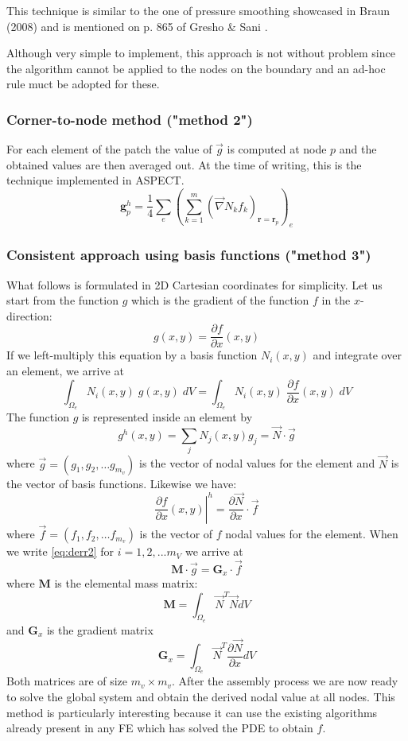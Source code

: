This technique is similar to the one of pressure smoothing showcased 
in Braun \etal (2008) \cite{brtf08}
and is mentioned on p. 865 of Gresho \& Sani \cite{grsa}.

Although very simple to implement, this approach is not without problem since 
the algorithm cannot be applied to the nodes on the boundary and an ad-hoc 
rule muct be adopted for these. 


\subsubsection{Corner-to-node method ("method 2")}

For each element of the patch the value of $\vec g$ is computed at node $p$ and the obtained
values are then averaged out. At the time of writing, this is the technique implemented in  
ASPECT.
\[
\bm g_p^h = \frac{1}{4} \sum_{e} \left( \sum_{k=1}^m  (\vec\nabla N_k f_k)_{\bm r=\bm r_p} \right)_e
\]


\subsubsection{Consistent approach using basis functions ("method 3")}

What follows is formulated in 2D Cartesian coordinates for simplicity. 
Let us start from the function $g$ which is the gradient of the function $f$
in the $x$-direction:
\[
g(x,y) = \frac{\partial f}{\partial x}(x,y)
\]
If we left-multiply this equation by a basis function $N_i(x,y)$ 
and integrate over an element, we arrive at 
\begin{equation}
\int_{\Omega_e} N_i(x,y)\; g(x,y)\; dV =
\int_{\Omega_e} N_i(x,y)\; \frac{\partial f}{\partial x}(x,y)\; dV
\label{eq:derr2}
\end{equation}
The function $g$ is represented inside an element by
\[
g^h(x,y) = \sum_j N_j(x,y) g_j = \vec{N} \cdot \vec{g}
\]
where $\vec{g}=(g_1,g_2,\dots g_{m_v})$ is the vector of nodal values for the element
and $\vec{N}$ is the vector of basis functions.
Likewise we have:
\[
\left. \frac{\partial f}{\partial x}(x,y) \right|^h = \frac{\partial \vec{N}}{\partial x}\cdot \vec{f}
\]
where $\vec{f}=(f_1,f_2,\dots f_{m_v})$ is the vector of $f$ nodal values for the element.
When we write \eqref{eq:derr2} for $i=1,2,...m_V$ we arrive at
\[
{\bm M}\cdot \vec{g} = {\bm G}_x\cdot \vec{f}
\]
where ${\bm M}$ is the elemental mass matrix:
\[
{\bm M}=\int_{\Omega_e} \vec{N}^T \vec{N} dV
\]
and ${\bm G}_x$ is the gradient matrix 
\[
{\bm G}_x=\int_{\Omega_e} \vec{N}^T \frac{\partial \vec{N}}{\partial x} dV
\]
Both matrices are of size $m_v \times m_v$.
After the assembly process we are now ready to solve the global system and obtain
the derived nodal value at all nodes. 
This method is particularly interesting because it can use the existing algorithms 
already present in any FE which has solved the PDE to obtain $f$.  

